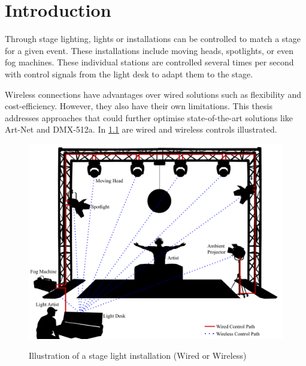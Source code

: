 \chapter{Introduction}


Through stage lighting, lights or installations can be controlled to match a stage for a given event.
These installations include moving heads, spotlights, or even fog machines.
These individual stations are controlled several times per second with control signals from the light desk
to adapt them to the stage.

Wireless connections have advantages over wired solutions such as flexibility and cost-efficiency.
However, they also have their own limitations.
This thesis addresses approaches that could further optimise state-of-the-art solutions like Art-Net and DMX-512a.
In \cref{fig:illustration} are wired and wireless controls illustrated.


\begin{figure}[h]
    \centering
    \includegraphics[scale=0.55]{figures/illustration.pdf}
    \label{fig:illustration}
    \caption{Illustration of a stage light installation (Wired or Wireless)}
\end{figure}

